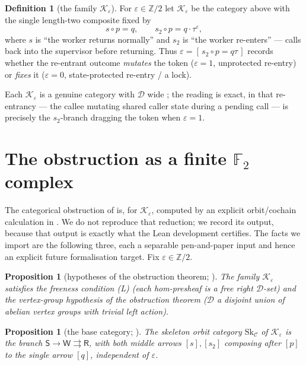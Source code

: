 \documentclass[11pt]{amsart}
\newtheorem{proposition}[theorem]{Proposition}
\theoremstyle{definition}
\newtheorem{definition}[theorem]{Definition}
\theoremstyle{remark}
\newcommand{\C}{\mathcal{C}}
\newcommand{\D}{\mathcal{D}}
\newcommand{\K}{\mathcal{K}}
\newcommand{\Sk}{\mathrm{Sk}}
\newcommand{\Sup}{\mathsf{S}}
\newcommand{\Wk}{\mathsf{W}}
\newcommand{\Rt}{\mathsf{R}}
\newcommand{\dir}{\mathcal{D}}
\newcommand{\FF}{\mathbb{F}_2}
\begin{document}
\begin{definition}[the family $\K_\varepsilon$]\label{def:family}
For $\varepsilon\in\mathbb Z/2$ let $\K_\varepsilon$ be the category above with the single length-two
composite fixed by
\[
  s\circ p=q,\qquad s_2\circ p=q\cdot\tau^{\varepsilon},
\]
where $s$ is ``the worker returns normally'' and $s_2$ is ``the worker re-enters'' --- calls back into
the supervisor before returning. Thus $\varepsilon=[\,s_2\circ p=q\tau\,]$ records whether the
re-entrant outcome \emph{mutates} the token ($\varepsilon=1$, unprotected re-entry) or \emph{fixes} it
($\varepsilon=0$, state-protected re-entry / a lock).
\end{definition}

Each $\K_\varepsilon$ is a genuine category with $\D$ wide \cite{analytic}; the reading is exact, in
that re-entrancy --- the callee mutating shared caller state during a pending call --- is precisely the
$s_2$-branch dragging the token when $\varepsilon=1$.

\section{The obstruction as a finite \texorpdfstring{$\FF$}{F2} complex}\label{sec:complex}

The categorical obstruction of \cite{gobstr} is, for $\K_\varepsilon$, computed by an explicit
orbit/cochain calculation in \cite{analytic}. We do not reproduce that reduction; we record its
output, because that output is exactly what the Lean development certifies. The facts we import are
the following three, each a separable pen-and-paper input and hence an explicit future formalisation
target. Fix $\varepsilon\in\mathbb Z/2$.

\begin{proposition}[hypotheses of the obstruction theorem; {\cite{analytic}}]\label{prop:red-hyp}
The family $\K_\varepsilon$ satisfies the freeness condition \textnormal{(L)} \textup{(}each
hom-presheaf is a free right $\dir$-set\textup{)} and the vertex-group hypothesis of the obstruction
theorem \textup{(}$\dir$ a disjoint union of abelian vertex groups with trivial left action\textup{)}.
\end{proposition}

\begin{proposition}[the base category; {\cite{analytic}}]\label{prop:red-branch}
The skeleton orbit category $\Sk_\C$ of $\K_\varepsilon$ is the branch
$\Sup\to\Wk\rightrightarrows\Rt$, with both middle arrows $[s],[s_2]$ composing after $[p]$ to the
single arrow $[q]$, \emph{independent of $\varepsilon$}.
\end{proposition}
\end{document}
